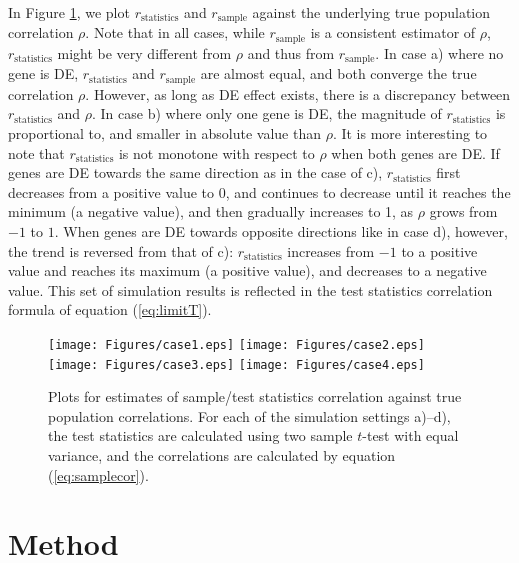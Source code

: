 \documentclass[12pt, a4paper]{article}
\begin{document}
	In Figure \ref{fig:tstat}, we plot $r_\text{statistics}$ and $r_{\text{sample}}$ against the underlying true population correlation $\rho$. Note that in all cases, while $r_{\text{sample}}$ is a consistent estimator of $\rho$, $r_\text{statistics}$ might be very different from $\rho$ and thus from $r_\text{sample}$.  
	In case a) where no gene is DE, $r_\text{statistics}$ and $r_{\text{sample}}$ are almost equal, and both converge the true correlation $\rho$. However, as long as DE effect exists, there is a discrepancy between $r_\text{statistics}$ and $\rho$. In case b) where only one gene is DE, 
	 the magnitude of $r_\text{statistics}$ is proportional to, and smaller in absolute value than $\rho$.
	It is more interesting to note that $r_\text{statistics}$ is not monotone with respect to 
	$\rho$ when both genes are DE. If genes are DE towards the same direction as in the case of 
	c),  $r_\text{statistics}$ first decreases from a positive value to 0, and continues to 
	decrease until it reaches the minimum (a negative value), and then gradually increases to 1, as 
	$\rho$ grows from $-1$ to $1$. When genes are DE towards opposite directions like in case d), 
	however, the trend is reversed from that of c): $r_\text{statistics}$ increases from $-1$ to a 
	positive value and reaches its maximum (a positive value), and decreases to a negative value. 
	This set of simulation results is reflected in the test statistics correlation formula of 
	equation (\ref{eq:limitT}). 
	
	\begin{figure}[!ht]
		\centering
		\texttt{[image: Figures/case1.eps]}
		\texttt{[image: Figures/case2.eps]}
		\texttt{[image: Figures/case3.eps]}
		\texttt{[image: Figures/case4.eps]}
	\caption{Plots for estimates of sample/test statistics correlation against true population correlations. For each of the simulation settings a)--d), the test statistics are calculated using two sample $t$-test with equal variance, and the correlations are calculated by equation (\ref{eq:samplecor}). }
		\label{fig:tstat}
	\end{figure}

	
	
	
	
	
	\section{Method}\label{section:testcormethod}
	
\end{document}
